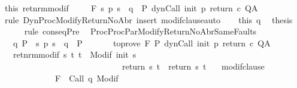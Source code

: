 \begin{isabellebody}
\ this\ ret{\isacharunderscore}nrm{\isacharunderscore}modif\ \isanewline
\ \ \isamarkupfalse%
\ {\isachardoublequoteopen}{\isasymGamma}{\isacharcomma}{\isasymTheta}{\isasymturnstile}\isactrlbsub {\isacharslash}F\isactrlesub \ {\isacharparenleft}{\isacharbraceleft}s{\isachardot}\ p\ s\ {\isacharequal}\ q{\isacharbraceright}\ {\isasyminter}\ P{\isacharprime}{\isacharparenright}\ {\isacharparenleft}dynCall\ init\ p\ return\ c{\isacharparenright}\ Q{\isacharcomma}A{\isachardoublequoteclose}\isanewline
\ \ \ \ \isamarkupfalse%
\ {\isacharparenleft}rule\ DynProcModifyReturnNoAbr{\isacharparenright}\ {\isacharparenleft}insert\ modif{\isacharunderscore}clause{\isacharcomma}auto{\isacharparenright}\isanewline
\ \ \isamarkupfalse%
\ this\ q\ \isamarkupfalse%
\ {\isacharquery}thesis\isanewline
\ \ \ \ \isamarkupfalse%
\ {\isacharparenleft}rule\ conseqPre{\isacharparenright}\ \isanewline
{}\isamarkupfalse%
%
\endisatagproof
{\isafoldproof}%
%
\isadelimproof
\isanewline
%
\endisadelimproof
\isanewline
{}\isamarkupfalse%
\ ProcProcParModifyReturnNoAbrSameFaults{\isacharcolon}\ \isanewline
\ \ \ q{\isacharcolon}\ {\isachardoublequoteopen}P\ {\isasymsubseteq}\ {\isacharbraceleft}s{\isachardot}\ p\ s\ {\isacharequal}\ q{\isacharbraceright}\ {\isasyminter}\ P{\isacharprime}{\isachardoublequoteclose}\isanewline
\ \ \ %
\isanewline
\ \ \ to{\isacharunderscore}prove{\isacharcolon}\ {\isachardoublequoteopen}{\isasymGamma}{\isacharcomma}{\isasymTheta}{\isasymturnstile}\isactrlbsub {\isacharslash}F\isactrlesub \ P{\isacharprime}\ {\isacharparenleft}dynCall\ init\ p\ return{\isacharprime}\ c{\isacharparenright}\ Q{\isacharcomma}A{\isachardoublequoteclose}\isanewline
\ \ \ ret{\isacharunderscore}nrm{\isacharunderscore}modif{\isacharcolon}\ {\isachardoublequoteopen}{\isasymforall}s\ t{\isachardot}\ t\ {\isasymin}\ {\isacharparenleft}Modif\ {\isacharparenleft}init\ s{\isacharparenright}{\isacharparenright}\ \isanewline
\ \ \ \ \ \ \ \ \ \ \ \ \ \ \ \ \ \ \ \ \ \ \ \ \ \ \ \ {\isasymlongrightarrow}\ return{\isacharprime}\ s\ t\ {\isacharequal}\ return\ s\ t{\isachardoublequoteclose}\isanewline
\ \ \ modif{\isacharunderscore}clause{\isacharcolon}\ \isanewline
\ \ \ \ \ \ \ \ \ \ \ \ {\isachardoublequoteopen}{\isasymforall}{\isasymsigma}{\isachardot}\ {\isasymGamma}{\isacharcomma}{\isasymTheta}{\isasymturnstile}\isactrlbsub {\isacharslash}F\isactrlesub \ {\isacharbraceleft}{\isasymsigma}{\isacharbraceright}\ {\isacharparenleft}Call\ q{\isacharparenright}\ {\isacharparenleft}Modif\ {\isasymsigma}{\isacharparenright}{\isacharcomma}{\isacharbraceleft}{\isacharbraceright}{\isachardoublequoteclose}\isanewline

\end{isabellebody}
